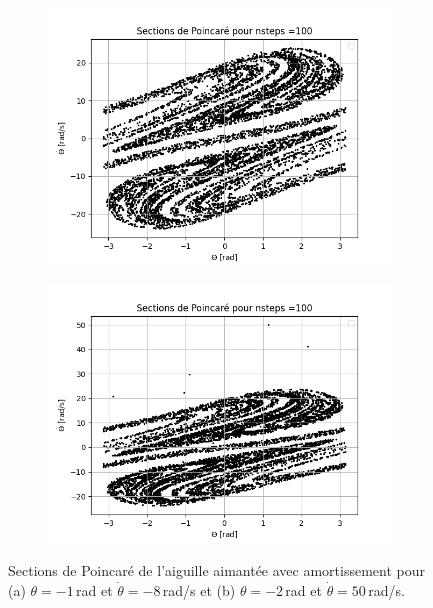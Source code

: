 \documentclass[a4paper,12pt,twoside]{article}
\begin{document}
\begin{figure}[H]
\begin{subfigure}{0.5\textwidth}  %
    \centering  %
    \includegraphics[scale=0.5]{graphes/question_5_b.png}
    \caption{}
    \label{fig8a}
\end{subfigure}
\hspace{0.01\textwidth}
\begin{subfigure}{0.5\textwidth}  %
    \centering  %
    \includegraphics[scale=0.5]{graphes/question_5_attracteur.png}
    \caption{}
    \label{fig8b}
\end{subfigure}
\captionsetup{justification=centering}
\caption{Sections de Poincaré de l'aiguille aimantée avec amortissement pour (a) $\theta=-1$\,rad et $\dot{\theta}=-8$\,rad/s et (b) $\theta=-2$\,rad et $\dot{\theta}=50$\,rad/s.}
\label{fig8}
\end{figure}
\end{document}
